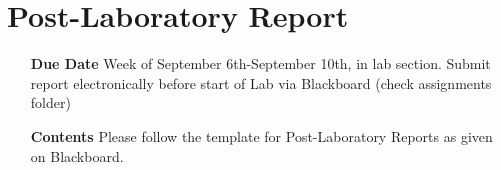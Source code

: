 \section{Post-Laboratory Report}

\begin{itemize}
	\item[\textbf{Due Date}]{Week of September 6th-September 10th, \the\year \space in lab section. Submit report electronically before start of Lab via Blackboard (check assignments folder)}
	\item[\textbf{Contents}]{Please follow the template for Post-Laboratory Reports as given on Blackboard.}
\end{itemize}
